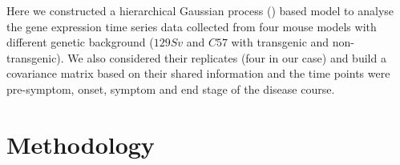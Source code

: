 Here we constructed a hierarchical Gaussian process (\cite{Hensman:2013}) based model to analyse the gene expression time series data collected from four mouse models with different genetic background ($129Sv$ and $C57$ with transgenic and non-transgenic). We also considered their replicates (four in our case) and build a covariance matrix based on their shared information and the time points were pre-symptom, onset, symptom and end stage of the disease course.


\section{Methodology}

